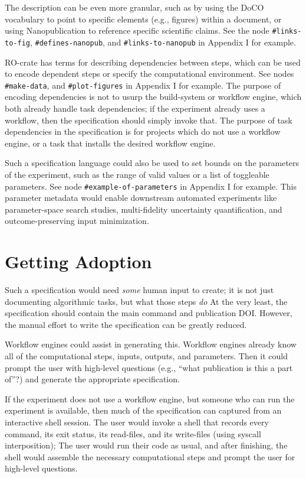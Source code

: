 \documentclass[manuscript,authordraft]{acmart}
\begin{document}
The description can be even more granular, such as by using the DoCO
vocabulary \cite{constantin_document_2016} to point to specific elements
(e.g., figures) within a document, or using Nanopublication
\cite{groth_anatomy_2010} to reference specific scientific claims. See
the node \texttt{\#links-to-fig}, \texttt{\#defines-nanopub}, and
\texttt{\#links-to-nanopub} in Appendix I for example.

RO-crate \cite{soiland-reyes_wf4ever_2013} has terms for describing
dependencies between steps, which can be used to encode dependent steps
or specify the computational environment. See nodes
\texttt{\#make-data}, and \texttt{\#plot-figures} in Appendix I for
example. The purpose of encoding dependencies is not to usurp the
build-system or workflow engine, which both already handle task
dependencies; if the experiment already uses a workflow, then the
specification should simply invoke that. The purpose of task
dependencies in the specification is for projects which do not use a
workflow engine, or a task that installs the desired workflow engine.

Such a specification language could also be used to set bounds on the
parameters of the experiment, such as the range of valid values or a
list of toggleable parameters. See node \texttt{\#example-of-parameters}
in Appendix I for example. This parameter metadata would enable
downstream automated experiments like parameter-space search studies,
multi-fidelity uncertainty quantification, and outcome-preserving input
minimization.

\hypertarget{getting-adoption}{%
\section{Getting Adoption}\label{getting-adoption}}

Such a specification would need \emph{some} human input to create; it is
not just documenting algorithmic tasks, but what those steps \emph{do}
At the very least, the specification should contain the main command and
publication DOI. However, the manual effort to write the specification
can be greatly reduced.

Workflow engines could assist in generating this. Workflow engines
already know all of the computational steps, inputs, outputs, and
parameters. Then it could prompt the user with high-level questions
(e.g., ``what publication is this a part of''?) and generate the
appropriate specification.

If the experiment does not use a workflow engine, but someone who can
run the experiment is available, then much of the specification can
captured from an interactive shell session. The user would invoke a
shell that records every command, its exit status, its read-files, and
its write-files (using syscall interposition); The user would run their
code as usual, and after finishing, the shell would assemble the
necessary computational steps and prompt the user for high-level
questions.
\end{document}
